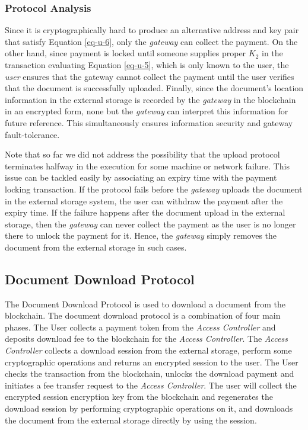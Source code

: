 \documentclass[conference]{IEEEtran}
\begin{document}
\subsubsection*{Protocol Analysis}
Since it is cryptographically hard to produce an alternative address and key pair that satisfy Equation \ref{eq-u-6}, only the {\it gateway} can collect the payment. On the other hand, since payment is locked until someone supplies proper $K_2$ in the transaction evaluating Equation \ref{eq-u-5}, which is only known to the user, the {\it user} ensures that the gateway cannot collect the payment until the user verifies that the document is successfully uploaded. Finally, since the document's location information in the external storage is recorded by the {\it gateway} in the blockchain in an encrypted form, none but the {\it gateway} can interpret this information for future reference. This simultaneously ensures information security and gateway fault-tolerance.

Note that so far we did not address the possibility that the upload protocol terminates halfway in the execution for some machine or network failure. This issue can be tackled easily by associating an expiry time with the payment locking transaction. If the protocol fails before the {\it gateway} uploads the document in the external storage system, the user can withdraw the payment after the expiry time. If the failure happens after the document upload in the external storage, then the {\it gateway} can never collect the payment as the user is no longer there to unlock the payment for it. Hence, the {\it gateway} simply removes the document from the external storage in such cases.      

\subsection{Document Download Protocol}
The Document Download Protocol is used to download a document from the blockchain. The document download protocol is a combination of four main phases. The User collects a payment token from the {\it Access Controller} and deposits download fee to the blockchain for the {\it Access Controller}. The {\it Access Controller} collects a download session from the external storage, perform some cryptographic operations and returns an encrypted session to the user. The User checks the transaction from the  blockchain, unlocks the download payment and initiates a fee transfer request to the {\it Access Controller}. The user will collect the encrypted session encryption key from the blockchain and regenerates the download session by performing cryptographic operations on it, and downloads the document from the external storage directly by using the session.
\end{document}
